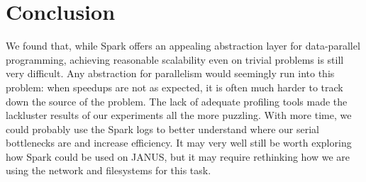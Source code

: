 \documentclass{article}
\begin{document}



\section{Conclusion}
We found that, while Spark offers an appealing abstraction layer for
data-parallel programming, achieving reasonable scalability even on trivial
problems is still very difficult. Any abstraction for parallelism would
seemingly run into this problem: when speedups are not as expected, it is often
much harder to track down the source of the problem.  The lack of adequate
profiling tools made the lackluster results of our experiments all the more
puzzling. With more time, we could probably use the Spark logs to better
understand where our serial bottlenecks are and increase efficiency. It may
very well still be worth exploring how Spark could be used on JANUS, but it may
require rethinking how we are using the network and filesystems for this task.



\end{document}
